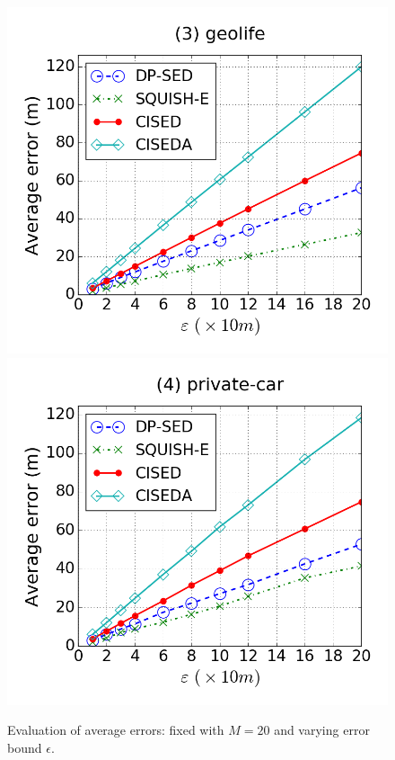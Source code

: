 \begin{figure}[tb]
\includegraphics[scale = 0.245]{figures/Exp-error-epsilon-geolife.png}
\includegraphics[scale = 0.245]{figures/Exp-error-epsilon-private.png}
\vspace{-3ex}
\caption{\small Evaluation of average errors: fixed with $M=20$ and varying error bound $\epsilon$.}
\label{fig:ae-m20}
\vspace{-2ex}
\end{figure}






